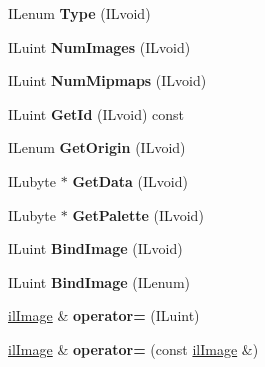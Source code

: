 \begin{DoxyCompactItemize}
\item 
\hypertarget{classilImage_ad724b3afce6c49eae49af2158d832ede}{
ILenum {\bfseries Type} (ILvoid)}
\label{classilImage_ad724b3afce6c49eae49af2158d832ede}

\item 
\hypertarget{classilImage_aec23182a2e056ced6680895c04c7b931}{
ILuint {\bfseries NumImages} (ILvoid)}
\label{classilImage_aec23182a2e056ced6680895c04c7b931}

\item 
\hypertarget{classilImage_a7afc1871456031066ea69ea9d231a20b}{
ILuint {\bfseries NumMipmaps} (ILvoid)}
\label{classilImage_a7afc1871456031066ea69ea9d231a20b}

\item 
\hypertarget{classilImage_aa0f628968dd2da034e42cd807eb89557}{
ILuint {\bfseries GetId} (ILvoid) const }
\label{classilImage_aa0f628968dd2da034e42cd807eb89557}

\item 
\hypertarget{classilImage_a2acb51c9214b2213c560cd3a7dac3885}{
ILenum {\bfseries GetOrigin} (ILvoid)}
\label{classilImage_a2acb51c9214b2213c560cd3a7dac3885}

\item 
\hypertarget{classilImage_a213efd952006724940c9e352ef3b9965}{
ILubyte $\ast$ {\bfseries GetData} (ILvoid)}
\label{classilImage_a213efd952006724940c9e352ef3b9965}

\item 
\hypertarget{classilImage_a47163489c1e66085cc5020982c17e903}{
ILubyte $\ast$ {\bfseries GetPalette} (ILvoid)}
\label{classilImage_a47163489c1e66085cc5020982c17e903}

\item 
\hypertarget{classilImage_ab40c72c1afe45689e34f3a3ac7f1a7be}{
ILuint {\bfseries BindImage} (ILvoid)}
\label{classilImage_ab40c72c1afe45689e34f3a3ac7f1a7be}

\item 
\hypertarget{classilImage_abc9220154ab6bc7f58810dba221a63ef}{
ILuint {\bfseries BindImage} (ILenum)}
\label{classilImage_abc9220154ab6bc7f58810dba221a63ef}

\item 
\hypertarget{classilImage_a460cdc6b81aa896adac2cf2166662c3a}{
\hyperlink{classilImage}{ilImage} \& {\bfseries operator=} (ILuint)}
\label{classilImage_a460cdc6b81aa896adac2cf2166662c3a}

\item 
\hypertarget{classilImage_a124b7bc379025a1d614db605b250b00a}{
\hyperlink{classilImage}{ilImage} \& {\bfseries operator=} (const \hyperlink{classilImage}{ilImage} \&)}
\label{classilImage_a124b7bc379025a1d614db605b250b00a}

\end{DoxyCompactItemize}
